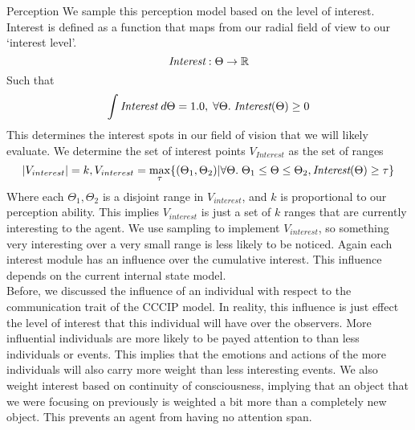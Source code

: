 \documentclass[11pt]{article}
\begin{document}
\begin{section}{Perception}
We sample this perception model based on the level of interest. Interest is defined as a function that maps from our radial field of view to our `interest level'.
\[\emph{Interest} : \Theta \rightarrow \mathbb{R}\]
Such that 
\[\int \emph{Interest}\; d\Theta = 1.0, \; \forall \Theta.\;\emph{Interest}(\Theta) \ge 0\]
This determines the interest spots in our field of vision that we will likely evaluate. We determine the set of interest points $V_{Interest}$ as the set of ranges 
\[|V_{interest}| = k, V_{interest} = \max_{\tau}\{(\Theta_1, \Theta_2) | \forall \Theta.\; \Theta_1 \le \Theta \le \Theta_2, \emph{Interest}(\Theta) \ge \tau\}\]
Where each $\Theta_1, \Theta_2$ is a disjoint range in $V_{interest}$, and $k$ is proportional to our perception ability. This implies $V_{interest}$ is just a set of $k$ ranges that are currently interesting to the agent. We use sampling to implement $V_{interest}$, so something very interesting over a very small range is less likely to be noticed. Again each interest module has an influence over the cumulative interest. This influence depends on the current internal state model.\\




Before, we discussed the influence of an individual with respect to the communication trait of the CCCIP model. In reality, this influence is just effect the level of interest that this individual will have over the observers. More influential individuals are more likely to be payed attention to than less individuals or events. This implies that the emotions and actions of the more individuals will also carry more weight than less interesting events. We also weight interest based on continuity of consciousness, implying that an object that we were focusing on previously is weighted a bit more than a completely new object. This prevents an agent from having no attention span.\\


\end{section}
\end{document}
